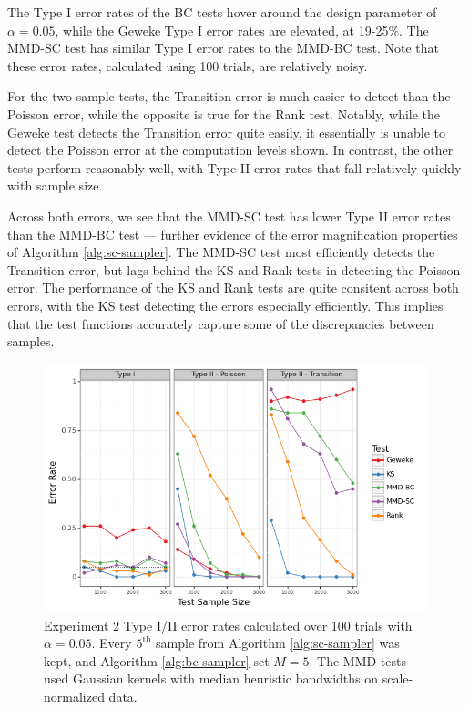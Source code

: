 \documentclass[a4paper,11pt]{article}
\begin{document}
The Type I error rates of the BC tests hover around the design parameter of $\alpha=0.05$, while the Geweke Type I error rates are elevated, at 19-25\%. The MMD-SC test has similar Type I error rates to the MMD-BC test. Note that these error rates, calculated using 100 trials, are relatively noisy.

For the two-sample tests, the Transition error is much easier to detect than the Poisson error, while the opposite is true for the Rank test.  Notably, while the Geweke test detects the Transition error quite easily, it essentially is unable to detect the Poisson error at the computation levels shown. In contrast, the other tests perform reasonably well, with Type II error rates that fall relatively quickly with sample size. 

Across both errors, we see that the MMD-SC test has lower Type II error rates than the MMD-BC test --- further evidence of the error magnification properties of Algorithm \ref{alg:sc-sampler}. The MMD-SC test most efficiently detects the Transition error, but lags behind the KS and Rank tests in detecting the Poisson error. The performance of the KS and Rank tests are quite consitent across both errors, with the KS test detecting the errors especially efficiently. This implies that the test functions accurately capture some of the discrepancies between samples.

\begin{figure}[H]
    \centering
    \includegraphics[width=\textwidth]{figures/bayes_lasso_comparison.png}
    \caption{Experiment 2 Type I/II error rates calculated over 100 trials with $\alpha=0.05$. Every $5^{\text{th}}$ sample from Algorithm \ref{alg:sc-sampler} was kept, and Algorithm \ref{alg:bc-sampler} set $M=5$. The MMD tests used Gaussian kernels with median heuristic bandwidths on scale-normalized data.}
    \label{fig:ex2_comparison}
\end{figure}
\end{document}
